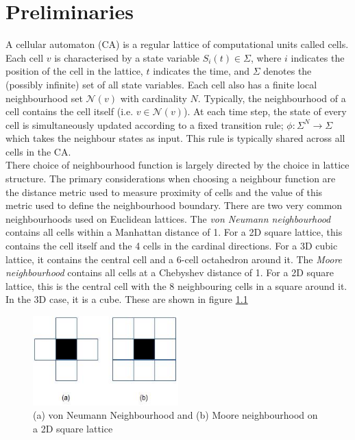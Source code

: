 \chapter{Preliminaries}

A cellular automaton (CA) is a regular lattice of computational units called cells. Each cell $v$ is characterised by a state variable $S_i(t) \in \Sigma$, where $i$ indicates the position of the cell in the lattice, $t$ indicates the time, and $\Sigma$ denotes the (possibly infinite) set of all state variables. Each cell also has a finite local neighbourhood set $\mathcal{N}(v)$ with cardinality $N$. Typically, the neighbourhood of a cell contains the cell itself (i.e. $v \in \mathcal{N}(v)$). At each time step, the state of every cell is simultaneously updated according to a fixed transition rule; $\phi:\Sigma^N \to \Sigma$ which takes the neighbour states as input. This rule is typically shared across all cells in the CA.\\

There choice of neighbourhood function is largely directed by the choice in lattice structure. The primary considerations when choosing a neighbour function are the distance metric used to measure proximity of cells and the value of this metric used to define the neighbourhood boundary. There are two very common neighbourhoods used on Euclidean lattices. The \textit{von Neumann neighbourhood} contains all cells within a Manhattan distance of 1. For a 2D square lattice, this contains the cell itself and the 4 cells in the cardinal directions. For a 3D cubic lattice, it contains the central cell and a 6-cell octahedron around it. The \textit{Moore neighbourhood} contains all cells at a Chebyshev distance of 1. For a 2D square lattice, this is the central cell with the 8 neighbouring cells in a square around it. In the 3D case, it is a cube. These are shown in figure \ref{fig:neighbourhoods}

\begin{figure}[!h]
\centering
\includegraphics[width=0.5\textwidth]{images/neighbourhoods.png}
\caption{(a) von Neumann Neighbourhood and (b) Moore neighbourhood on a 2D square lattice \cite{debasis2011survey}}
\label{fig:neighbourhoods}
\end{figure}

